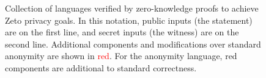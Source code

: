 \begin{figure}
\begin{pcvstack}[boxed, center, space=2em]
\begin{pchstack}[center, space=1em]

      \end{pchstack}
    \end{pcvstack} %
    \caption{Collection of languages verified by zero-knowledge proofs to achieve Zeto privacy goals. In this notation, public inputs (the statement) are on the first line, and secret inputs (the witness) are on the second line. Additional components and modifications over standard anonymity are shown in \textcolor{red}{red}. For the anonymity language, red components are additional to standard correctness.}
    \label{fig:zeto_proofs}
\end{figure}



